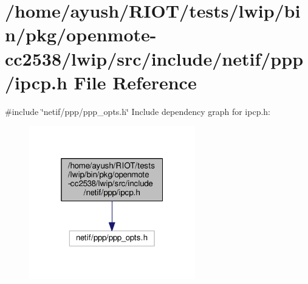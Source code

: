 \hypertarget{openmote-cc2538_2lwip_2src_2include_2netif_2ppp_2ipcp_8h}{}\section{/home/ayush/\+R\+I\+O\+T/tests/lwip/bin/pkg/openmote-\/cc2538/lwip/src/include/netif/ppp/ipcp.h File Reference}
\label{openmote-cc2538_2lwip_2src_2include_2netif_2ppp_2ipcp_8h}
{\ttfamily \#include \char`\"{}netif/ppp/ppp\+\_\+opts.\+h\char`\"{}}\newline
Include dependency graph for ipcp.\+h\+:
\nopagebreak
\begin{figure}[H]
\begin{center}
\leavevmode
\includegraphics[width=205pt]{openmote-cc2538_2lwip_2src_2include_2netif_2ppp_2ipcp_8h__incl}
\end{center}
\end{figure}
